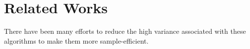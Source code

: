 \section{Related Works}
\label{sec:rw}

There have been many efforts to reduce the high variance associated with these algorithms to make them more sample-efficient.
